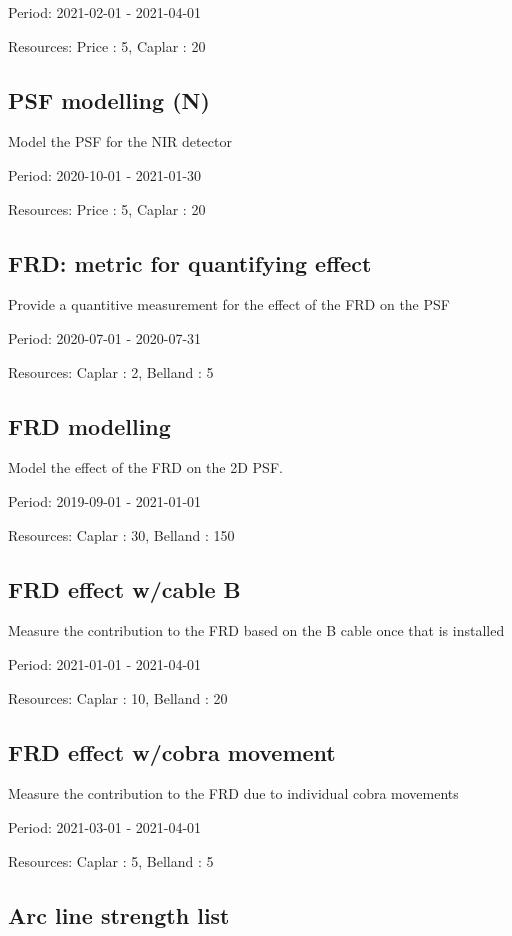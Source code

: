 Period: 2021-02-01 - 2021-04-01

Resources: Price : 5, Caplar : 20

\subsection{PSF modelling (N)}

Model the PSF for the NIR detector

Period: 2020-10-01 - 2021-01-30

Resources: Price : 5, Caplar : 20

\subsection{FRD: metric for quantifying effect}

Provide a quantitive measurement for the effect of the FRD on the PSF

Period: 2020-07-01 - 2020-07-31

Resources: Caplar : 2, Belland : 5

\subsection{FRD modelling}

Model the effect of the FRD on the 2D PSF.

Period: 2019-09-01 - 2021-01-01

Resources: Caplar : 30, Belland : 150

\subsection{FRD effect w/cable B}

Measure the contribution to the FRD based on the B cable once that is installed

Period: 2021-01-01 - 2021-04-01

Resources: Caplar : 10, Belland : 20

\subsection{FRD effect w/cobra movement}

Measure the contribution to the FRD due to individual cobra movements

Period: 2021-03-01 - 2021-04-01

Resources: Caplar : 5, Belland : 5

\subsection{Arc line strength list}

